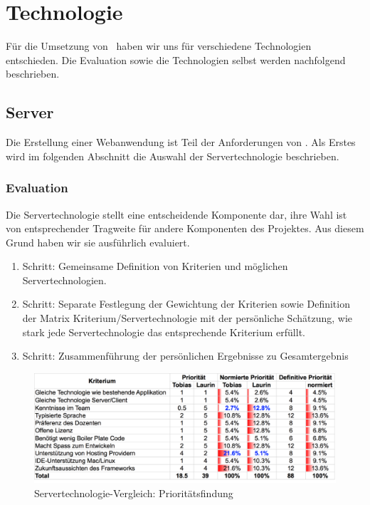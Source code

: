 \section{Technologie}\label{architektur.technologie}
	Für die Umsetzung von \eeppi\ haben wir uns für verschiedene Technologien entschieden.
	Die Evaluation sowie die Technologien selbst werden nachfolgend beschrieben.

	\subsection{Server}
		Die Erstellung einer Webanwendung ist Teil der Anforderungen von \eeppi.
		Als Erstes wird im folgenden Abschnitt die Auswahl der Servertechnologie beschrieben.

		\subsubsection{Evaluation}
			\label{serverEvaluation}
			
			Die Servertechnologie stellt eine entscheidende Komponente dar, 
			ihre Wahl ist von entsprechender Tragweite für andere Komponenten des Projektes.
			Aus diesem Grund haben wir sie ausführlich evaluiert.
			
			\begin{enumerate}
				\item Schritt: Gemeinsame Definition von Kriterien und möglichen Servertechnologien.
				\item Schritt: Separate Festlegung der Gewichtung der Kriterien sowie Definition der Matrix Kriterium/Servertechnologie mit der persönliche Schätzung, wie stark jede Servertechnologie das entsprechende Kriterium erfüllt.
				\item Schritt: Zusammenführung der persönlichen Ergebnisse zu Gesamtergebnis
			\end{enumerate}
		
			\begin{figure}[H]
				\begin{minipage}[b]{\linewidth}
					\includegraphics[width=\textwidth]{media/spreadsheets/ServertechnologieVergleichPrioritaetsfinding.pdf}
					\centering
					\caption{Servertechnologie-Vergleich: Prioritätsfindung}
					\label{fig:ServertechnologieVergleichPrioritaetsfinding}
				\end{minipage}
			\end{figure}
			
